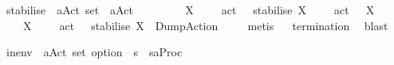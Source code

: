 \begin{isabellebody}
\begin{isamarkuptext}
\end{isamarkuptext}\isamarkuptrue%
\isamarkupfalse%
\ stabilise\ {\isacharcolon}{\kern0pt}{\isacharcolon}{\kern0pt}\ {\isacartoucheopen}{\isacharparenleft}{\kern0pt}{\isacharprime}{\kern0pt}a{\isacharparenright}{\kern0pt}Act{\isacharunderscore}{\kern0pt}{\isasymtheta}\ set\ {\isasymRightarrow}\ {\isacharparenleft}{\kern0pt}{\isacharprime}{\kern0pt}a{\isacharparenright}{\kern0pt}Act{\isacharunderscore}{\kern0pt}{\isasymtheta}{\isacartoucheclose}\isanewline
\ \ \ \isanewline
\ \ \ \ {\isacartoucheopen}{\isasymforall}\ {\isasymalpha}{\isasymin}X{\isachardot}{\kern0pt}\ {\isacharparenleft}{\kern0pt}{\isasymexists}\ {\isasymalpha}{\isacharprime}{\kern0pt}{\isachardot}{\kern0pt}\ {\isasymalpha}\ {\isacharequal}{\kern0pt}\ act\ {\isasymalpha}{\isacharprime}{\kern0pt}{\isacharparenright}{\kern0pt}\ {\isasymLongrightarrow}\ stabilise\ X\ {\isacharequal}{\kern0pt}\ {\isasymepsilon}\ {\isacharbraceleft}{\kern0pt}{\isasymalpha}{\isacharprime}{\kern0pt}\ {\isachardot}{\kern0pt}\ act\ {\isasymalpha}{\isacharprime}{\kern0pt}\ {\isasymin}\ X{\isacharbraceright}{\kern0pt}{\isacartoucheclose}\isanewline
\ \ {\isacharbar}{\kern0pt}\ {\isacartoucheopen}{\isasymexists}\ {\isasymalpha}{\isasymin}X{\isachardot}{\kern0pt}\ {\isacharparenleft}{\kern0pt}{\isasymnexists}\ {\isasymalpha}{\isacharprime}{\kern0pt}{\isachardot}{\kern0pt}\ {\isasymalpha}\ {\isacharequal}{\kern0pt}\ act\ {\isasymalpha}{\isacharprime}{\kern0pt}{\isacharparenright}{\kern0pt}\ {\isasymLongrightarrow}\ stabilise\ X\ {\isacharequal}{\kern0pt}\ DumpAction{\isacartoucheclose}\ \isanewline
%
\isadelimproof
\ \ %
\endisadelimproof
%
\isatagproof
{}\isamarkupfalse%
\ metis{\isacharplus}{\kern0pt}%
\endisatagproof
{\isafoldproof}%
%
\isadelimproof
\isanewline
%
\endisadelimproof
{}\isamarkupfalse%
%
\isadelimproof
\ %
\endisadelimproof
%
\isatagproof
{}\isamarkupfalse%
\ {\isachardoublequoteopen}termination{\isachardoublequoteclose}\ \isamarkupfalse%
\ blast%
\endisatagproof
{\isafoldproof}%
%
\isadelimproof
%
\endisadelimproof
%
\begin{isamarkuptext}%
\pagebreak%
\end{isamarkuptext}\isamarkuptrue%
\isamarkupfalse%
\ in{\isacharunderscore}{\kern0pt}env\ {\isacharcolon}{\kern0pt}{\isacharcolon}{\kern0pt}\ {\isacartoucheopen}{\isacharparenleft}{\kern0pt}{\isacharprime}{\kern0pt}a{\isacharparenright}{\kern0pt}Act{\isacharunderscore}{\kern0pt}{\isasymtheta}\ set\ option\ {\isasymRightarrow}\ {\isacharprime}{\kern0pt}s\ {\isasymRightarrow}\ {\isacharparenleft}{\kern0pt}{\isacharprime}{\kern0pt}s{\isacharcomma}{\kern0pt}{\isacharprime}{\kern0pt}a{\isacharparenright}{\kern0pt}Proc{\isacharunderscore}{\kern0pt}{\isasymtheta}{\isacartoucheclose}\isanewline

\end{isabellebody}
